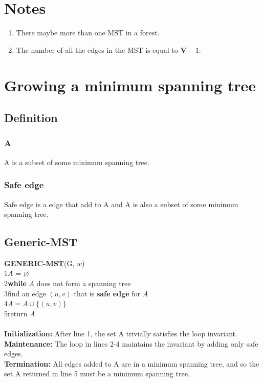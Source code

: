 \section {Notes}

\begin{enumerate}[label=(\roman*)]
\item There maybe more than one MST in a forest.
\item The number of all the edges in the MST is equal to $\boldsymbol{V} - 1$.
\end{enumerate}

\section {Growing a minimum spanning tree}

\subsection {Definition}

\subsubsection {A}
A is a subset of some minimum spanning tree.  

\subsubsection {Safe edge}
Safe edge is a edge that add to A and A is also a subset of some minimum
spanning tree.

\subsection {Generic-MST}

\textbf{GENERIC-MST}(G, $w$)\\
1\space $A$ = $\varnothing$\\
2\space \textbf{while} $A$ does not form a spanning tree\\
3\space\space\space\space find an edge $(u, v)$ that is
\textbf{safe edge} for $A$\\
4\space\space\space\space $A = A \cup \{(u, v)\}$\\
5\space return $A$\\
\\
\textbf{Initialization:} After line 1, the set A trivially satisfies the loop
invariant.\\
\textbf{Maintenance:} The loop in lines 2-4 maintains the invariant by adding
only safe edges.\\
\textbf{Termination:} All edges added to A are in a minimum spanning tree, and
so the set A returned in line 5 must be a minimum spanning tree.


